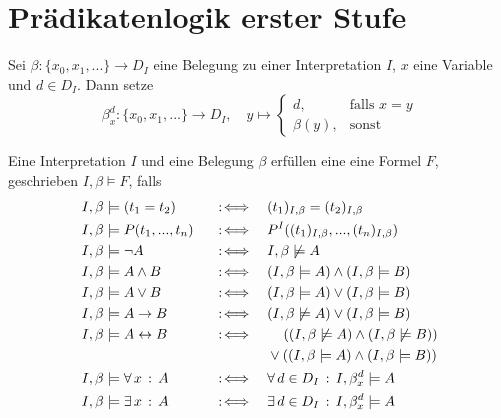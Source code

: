 \documentclass{cheat-sheet}
\newcommand{\Ibm}{I, \beta \models}
\newcommand{\Ibnm}{I, \beta \not\models}
\newcommand{\Iba}[1]{(#1)_{I,\beta}} %
\newcommand{\lra}{\leftrightarrow}
\begin{document}

\section{Prädikatenlogik erster Stufe}





\begin{nota}
  Sei $\beta : \{ x_0, x_1, ... \} \to D_I$ eine Belegung zu einer Interpretation $I$, $x$ eine Variable und $d \in D_I$. Dann setze
  \[ \beta_x^d : \{ x_0, x_1, ... \} \to D_I, \quad y \mapsto \begin{cases} d, & \text{falls } x = y \\ \beta(y), & \text{sonst} \end{cases} \]
\end{nota}



\begin{defn}
  Eine Interpretation $I$ und eine Belegung $\beta$ erfüllen eine eine Formel $F$, geschrieben $I, \beta \models F$, falls
  \begin{alignat*}{3}
    & \Ibm (t_1 = t_2) &&\coloniff&& \Iba{t_1} = \Iba{t_2}\\
    & \Ibm P(t_1, ..., t_n) &&\coloniff&& P^I(\Iba{t_1}, ..., \Iba{t_n}) \\
    & \Ibm \neg A &&\coloniff&& \Ibnm A \\
    & \Ibm A \wedge B &&\coloniff&& (\Ibm A) \wedge (\Ibm B) \\
    & \Ibm A \vee B &&\coloniff&& (\Ibm A) \vee (\Ibm B) \\
    & \Ibm A \to B &&\coloniff&& (\Ibnm A) \vee (\Ibm B) \\
    & \Ibm A \lra B &&\coloniff&& \quad\, ((\Ibnm A) \wedge (\Ibnm B))\\
    & && && \vee ((\Ibm A) \wedge (\Ibm B)) \\
    & \Ibm \fa{x} A &&\coloniff&& \fa{d \in D_I} I, \beta_x^d \models A \\
    & \Ibm \ex{x} A &&\coloniff&& \ex{d \in D_I} I, \beta_x^d \models A
  \end{alignat*}
\end{defn}
\end{document}
